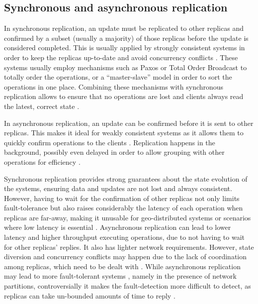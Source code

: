 \subsection{Synchronous and asynchronous replication}


In synchronous replication, an update must be replicated to other replicas and confirmed by a subset (usually a majority) of those replicas before the update is considered completed.
This is usually applied by strongly consistent systems in order to keep the replicas up-to-date and avoid concurrency conflicts \cite{dynamo, spanner}.
These systems usually employ mechanisms such as Paxos \cite{paxos} or Total Order Broadcast \cite{tob} to totally order the operations, or a ``master-slave'' model in order to sort the operations in one place.
Combining these mechanisms with synchronous replication allows to ensure that no operations are lost and clients always read the latest, correct state \cite{spanner}.


In asynchronous replication, an update can be confirmed before it is sent to other replicas.
This makes it ideal for weakly consistent systems as it allows them to quickly confirm operations to the clients \cite{cops}.
Replication happens in the background, possibly even delayed in order to allow grouping with other operations for efficiency \cite{dynamo, cure}.

Synchronous replication provides strong guarantees about the state evolution of the systems, ensuring data and updates are not lost and always consistent.
However, having to wait for the confirmation of other replicas not only limits fault-tolerance \cite{spanner} but also raises considerably the latency of each operation when replicas are far-away, making it unusable for geo-distributed systems or scenarios where low latency is essential \cite{slog}.
Asynchronous replication can lead to lower latency and higher throughput executing operations, due to not having to wait for other replicas' replies.
It also has lighter network requirements.
However, state diversion and concurrency conflicts may happen due to the lack of coordination among replicas, which need to be dealt with \cite{dynamo}.
While asynchronous replication may lead to more fault-tolerant systems \cite{dynamo, cassandra, cops}, namely in the presence of network partitions, controversially it makes the fault-detection more difficult to detect, as replicas can take un-bounded amounts of time to reply \cite{cap}.

